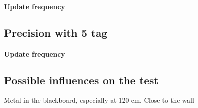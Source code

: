 \paragraph{Update frequency}

\subsection{Precision with 5 tag}

\paragraph{Update frequency}

\subsection{Possible influences on the test}
Metal in the blackboard, especially at 120 cm.
Close to the wall


